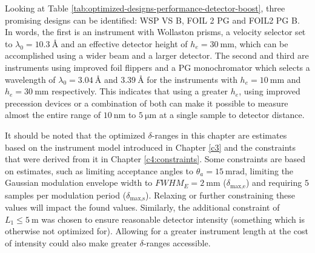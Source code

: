 Looking at Table \ref{tab:optimized-designs-performance-detector-boost}, three promising designs can be identified: WSP VS B, FOIL 2 PG and FOIL2 PG B. In words, the first is an instrument with Wollaston prisms, a velocity selector set to $\lambda_0 = \SI{10.3}{\angstrom}$ and an effective detector height of $h_e = \SI{30}{\milli\meter}$, which can be accomplished using a wider beam and a larger detector. The second and third are instruments using improved foil flippers and a PG monochromator which selects a wavelength of $\lambda_0 = \SI{3.04}{\angstrom}$ and $\SI{3.39}{\angstrom}$ for the instruments with $h_e = \SI{10}{\milli\meter}$ and $h_e = \SI{30}{\milli\meter}$ respectively. This indicates that using a greater $h_e$, using improved precession devices or a combination of both can make it possible to measure almost the entire range of $\SI{10}{\nano\meter}$ to $ \SI{5}{\micro\meter}$ at a single sample to detector distance. 

It should be noted that the optimized $\delta$-ranges in this chapter are estimates based on the instrument model introduced in Chapter \ref{c3} and the constraints that were derived from it in Chapter \ref{c4:constraints}. Some constraints are based on estimates, such as limiting acceptance angles to $\theta_a = \SI{15}{\milli\radian}$, limiting the Gaussian modulation envelope width to $FWHM_E = \SI{2}{\milli\meter}$ ($\delta_{\text{max,e}}$) and requiring $5$ samples per modulation period ($\delta_{\text{max,s}}$). Relaxing or further constraining these values will impact the found values. Similarly, the additional constraint of $L_1 \leq \SI{5}{\meter}$ was chosen to ensure reasonable detector intensity (something which is otherwise not optimized for). Allowing for a greater instrument length at the cost of intensity could also make greater $\delta$-ranges accessible.



